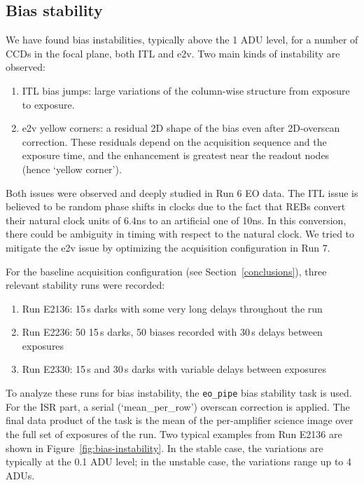 
\subsection{Bias stability}\label{sec:bias-stability-2}

We have found bias instabilities, typically above the 1 ADU level, for a number of CCDs in the focal plane, both ITL and e2v. Two main kinds of instability are observed:

\begin{enumerate}
\tightlist
\item
  ITL bias jumps: large variations of the column-wise structure from
  exposure to exposure.
\item
  e2v yellow corners: a residual 2D shape of the bias even after
  2D-overscan correction. These residuals depend on the acquisition
  sequence and the exposure time, and the enhancement is greatest near the readout nodes (hence `yellow corner').
\end{enumerate}

Both issues were observed and deeply studied in Run 6 EO data. The ITL
issue is believed to be random phase shifts in clocks due to the fact that REBs convert their natural clock units of 6.4ns to an artificial one of 10ns. In this conversion, there could be ambiguity in timing with respect to the natural clock. We tried to mitigate the e2v issue by
optimizing the acquisition configuration in Run 7.

For the baseline acquisition configuration (see Section~\ref{conclusions}), three
relevant stability runs were recorded:

\begin{enumerate}
\tightlist
\item
  Run E2136: 15\,s darks with some very long delays throughout the run
\item
  Run E2236: 50 15\,s darks, 50 biases recorded with 30\,s delays between
  exposures
\item
  Run E2330: 15\,s and 30\,s darks with variable delays between exposures
\end{enumerate}

To analyze these runs for bias instability, the {\tt eo\_pipe} bias
stability task is used.  For the ISR part, a serial
(`mean\_per\_row')
overscan correction is applied. The final data product of the task is the
mean of the per-amplifier science image over the full set of exposures
of the run. Two typical examples from Run E2136 are shown in Figure~\ref{fig:bias-instability}. In the stable case, the variations are typically at the 0.1 ADU
level; in the unstable case, the variations range up to 4 ADUs.

